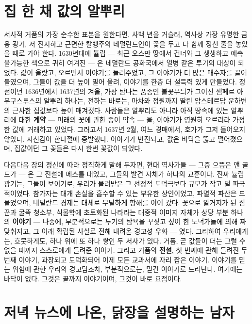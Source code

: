 \section*{집 한 채 값의 알뿌리}

서사적 거품의 가장 순수한 표본을 원한다면, 사백 년을 거슬러, 역사상 가장 유명한 금융 광기, 저 진지하고 근면한 칼뱅주의 네덜란드인이 꽃을 두고 다 함께 정신 줄을 놓았을 때로 가야 한다. 1630년대에 튤립 — 최근 오스만 땅에서 건너와 그 생생하고 예측 불가능한 색으로 귀히 여겨진 — 은 네덜란드 공화국에서 열병 같은 투기의 대상이 되었다. 값이 올랐고, 오르면서 이야기를 들려주었고, 그 이야기가 더 많은 매수자를 끌어들였으며, 그들이 값을 더 높이 밀어 올려, 이야기를 한층 더 설득력 있게 만들었다. 정점이던 1636년에서 1637년의 겨울, 가장 탐나는 품종인 불꽃무늬가 그어진 셈페르 아우구스투스의 알뿌리 하나는, 전하는 바로는, 마차와 정원까지 딸린 암스테르담 운하변의 근사한 집값보다 높이 매겨졌다. 사람들은 알뿌리도 아니라 아직 땅속에 있는 알뿌리에 대한 \textbf{계약} — 미래의 꽃에 관한 종이 약속 — 을, 이야기가 영원히 오르리라 가정한 값에 거래하고 있었다. 그러고서 1637년 2월, 여느 경매에서, 호가가 그저 들어오지 않았다. 자신감이 한나절에 증발했다. 이야기가 반전되고, 값은 바닥을 뚫고 떨어졌으며, 집값이던 그 꽃들은 다시 한번 꽃값이 되었다.

다음다음 장의 정신에 따라 정직하게 말해 두자면, 현대 역사가들 — 그중 으뜸은 앤 골드가 — 은 그 전설에 메스를 대었고, 그들의 발견 자체가 하나의 교훈이다. 진짜 튤립 광기는, 그들이 보이기로, 우리가 물려받은 그 선정적 도덕극보다 규모가 작고 덜 파국적이었다. 참가자는 대개 손실을 흡수할 수 있는 부유한 상인이었고, 파멸적 파산은 드물었으며, 네덜란드 경제는 대체로 무탈하게 항해를 이어 갔다. 꽃으로 알거지가 된 짐꾼과 굴뚝 청소부, 식물학에 초토화된 나라라는 대중적 이미지 자체가 상당 부분 하나의 \textbf{이야기} — 나중에, 부분적으로는 투기의 탐욕을 꾸짖고 싶어 한 도덕가들에 의해 짜맞춰지고, 그 이래 확립된 사실로 전해 내려온 경고성 우화 — 였다. 그리하여 우리에게는, 흐뭇하게도, 하나 위에 또 하나 쌓인 두 서사가 있다. 거품, 곧 값들이 더는 그럴 수 없을 때까지 스스로에게 들려준 이야기. 그리고 거품의 \textbf{전설}, 첫 번째에 관해 들려진 두 번째 이야기, 과장되고 도덕화되어 이제 모든 교과서에 자리 잡은 이야기. 이야기를 믿는 위험에 관한 우리의 경고담조차, 부분적으로는, 믿긴 이야기로 드러난다. 여기에는 바닥이 없다. 그것은 끝까지 이야기이며, 그것이 바로 요점이다.

\section*{저녁 뉴스에 나온, 닭장을 설명하는 남자}

